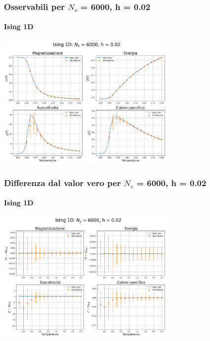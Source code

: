 \begin{frame}
    \frametitle{Osservabili per $N_s$ = 6000, h = 0.02}
    \framesubtitle{Ising 1D}

    \centering
    \includegraphics[width=0.65\textwidth]{Immagini/backupIsing1D/obs_6000_0.02.png}

\end{frame}



\begin{frame}
    \frametitle{Differenza dal valor vero per $N_s$ = 6000, h = 0.02}
    \framesubtitle{Ising 1D}

    \centering
    \includegraphics[width=0.65\textwidth]{Immagini/backupIsing1D/obs_6000_0.02_diff.png}

\end{frame}



